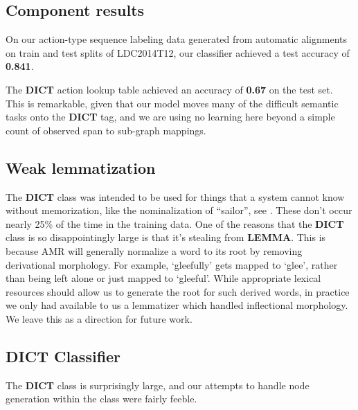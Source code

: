 \documentclass[11pt]{article}
\begin{document}

\subsection{Component results}

On our action-type sequence labeling data generated from automatic alignments on train and test splits of LDC2014T12, our classifier achieved a test accuracy of \textbf{0.841}.

The \textbf{DICT} action lookup table achieved an accuracy of \textbf{0.67} on the test set. This is remarkable, given that our model moves many of the difficult semantic tasks onto the \textbf{DICT} tag, and we are using no learning here beyond a simple count of observed span to sub-graph mappings.



\subsection{Weak lemmatization}

The \textbf{DICT} class was intended to be used for things that a system cannot know without memorization, like the nominalization of ``sailor'', see . These don't occur nearly 25\% of the time in the training data. One of the reasons that the \textbf{DICT} class is so disappointingly large is that it's stealing from \textbf{LEMMA}. This is because AMR will generally normalize a word to its root by removing derivational morphology. For example, `gleefully' gets mapped to `glee', rather than being left alone or just mapped to `gleeful'. While appropriate lexical resources should allow us to generate the root for such derived words, in practice we only had available to us a lemmatizer which handled inflectional morphology. We leave this as a direction for future work.

\subsection{DICT Classifier}

The \textbf{DICT} class is surprisingly large, and our attempts to handle node generation within the class were fairly feeble.
\end{document}
